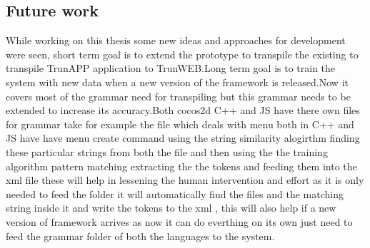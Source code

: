 \documentclass[23pt]{article}
\begin{document}
\subsection{Future work}
{\Large While working on this thesis some new ideas and approaches for development were seen, short term goal is to extend the prototype to transpile the existing to transpile TrunAPP application to TrunWEB.Long term goal is to train the system with new data when a new version of the framework is released.Now it covers most of the grammar need for transpiling but this grammar needs to be extended to increase its accuracy.Both cocos2d C++ and JS have there own files for grammar take for example the file which deals with menu both in C++ and JS have have menu create command using the string similarity alogirthm finding these particular strings from both the file and then using the the training algorithm pattern matching extracting the the tokens and feeding them into the xml file these will help in lessening the human intervention and effort as it is only needed to feed the folder it will automatically find the files and the matching string inside it and write the tokens to the xml , this will also help if a new version of framework arrives as now it can do everthing on its own just need to feed the grammar folder of both the languages to the system.  \\  \par}

\newpage

\setcounter{secnumdepth}{0}
\end{document}
